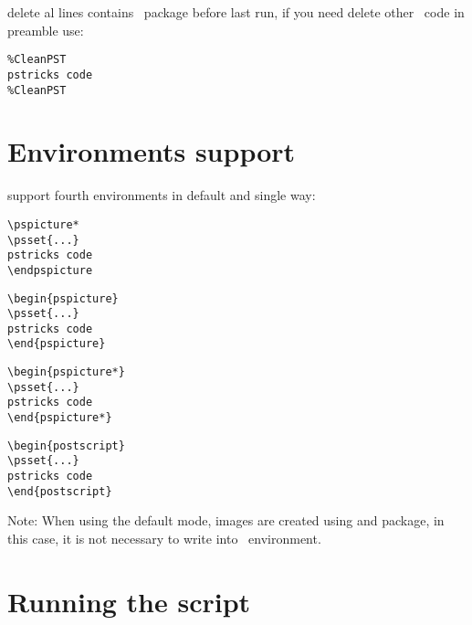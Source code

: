 \documentclass[11pt,english,BCOR=10mm,DIV=12,bibliography=totoc,parskip=false,headings=small,
    headinclude=false,footinclude=false,twoside]{pst-doc}
\begin{document}
 delete al lines contains \PST\ package before last run, if you need delete other \PST\ code in preamble use:

\begin{verbatim}
%CleanPST
pstricks code
%CleanPST
\end{verbatim}

\section{Environments support}
 support fourth environments in default and single way:

\vspace{10pt}
\begin{minipage}[c]{0.25\textwidth}
\begin{verbatim}
\pspicture*
\psset{...}
pstricks code
\endpspicture
\end{verbatim}
\end{minipage}
\begin{minipage}[c]{0.25\textwidth}
\begin{verbatim}
\begin{pspicture}
\psset{...}
pstricks code
\end{pspicture}
\end{verbatim}
\end{minipage}
\begin{minipage}[c]{0.25\textwidth}
\begin{verbatim}
\begin{pspicture*}
\psset{...}
pstricks code
\end{pspicture*}
\end{verbatim}
\end{minipage}
\begin{minipage}[c]{0.25\textwidth}
\begin{verbatim}
\begin{postscript}
\psset{...}
pstricks code
\end{postscript}
\end{verbatim}
\end{minipage}

\vspace{10pt}
Note: When using the default mode, images are created using  and  package, in this case, it is not necessary
to write  into \PST\ environment.
\newpage
\section{Running the script}
\end{document}
